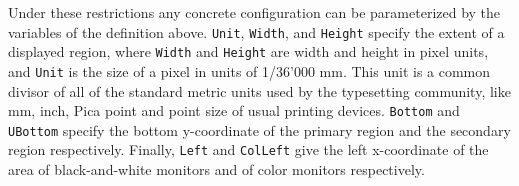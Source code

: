 Under these restrictions any concrete configuration can be parameterized by the variables
of the definition above. \verb|Unit|, \verb|Width|, and \verb|Height| specify the extent
of a displayed region, where \verb|Width| and \verb|Height| are width and height in pixel units,
and \verb|Unit| is the size of a pixel in units of 1/36’000 mm.  This unit is a common divisor
of all of the standard metric units used by the typesetting community, like mm, inch, Pica point
and point size of usual printing devices.  \verb|Bottom| and \verb|UBottom| specify
the bottom y-coordinate of the primary region and the secondary region respectively.
Finally, \verb|Left| and \verb|ColLeft| give the left x-coordinate of the area
of black-and-white monitors and of color monitors respectively.

